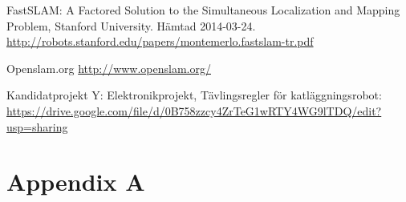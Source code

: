 \documentclass[a4paper,12pt,fleqn]{article}
\begin{document}
FastSLAM: A Factored Solution to the Simultaneous
Localization and Mapping Problem, Stanford University. Hämtad 2014-03-24.
\url{http://robots.stanford.edu/papers/montemerlo.fastslam-tr.pdf}

Openslam.org
\url{http://www.openslam.org/}

Kandidatprojekt Y: Elektronikprojekt, Tävlingsregler för katläggningsrobot: \url{https://drive.google.com/file/d/0B758zzcy4ZrTeG1wRTY4WG9lTDQ/edit?usp=sharing}

% 
\newpage \appendix \pagestyle{empty}
 \section{Appendix A}
\end{document}
